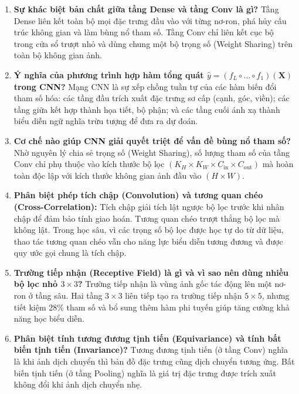 \documentclass[12pt,a4paper]{report}
\begin{document}
\begin{enumerate}[label=\textbf{\arabic*.}]
    \item \textbf{Sự khác biệt bản chất giữa tầng Dense và tầng Conv là gì?}
    Tầng Dense liên kết toàn bộ mọi đặc trưng đầu vào với từng nơ-ron, phá hủy cấu trúc không gian và làm bùng nổ tham số. Tầng Conv chỉ liên kết cục bộ trong cửa sổ trượt nhỏ và dùng chung một bộ trọng số (Weight Sharing) trên toàn bộ không gian ảnh.
    
    \item \textbf{Ý nghĩa của phương trình hợp hàm tổng quát $\hat{y} = (f_L \circ \dots \circ f_1)(\mathbf{X})$ trong CNN?}
    Mạng CNN là sự xếp chồng tuần tự của các hàm biến đổi tham số hóa: các tầng đầu trích xuất đặc trưng sơ cấp (cạnh, góc, viền); các tầng giữa kết hợp thành họa tiết, bộ phận; và các tầng cuối ánh xạ thành biểu diễn ngữ nghĩa trừu tượng để đưa ra dự đoán.
    
    \item \textbf{Cơ chế nào giúp CNN giải quyết triệt để vấn đề bùng nổ tham số?}
    Nhờ nguyên lý chia sẻ trọng số (Weight Sharing), số lượng tham số của tầng Conv chỉ phụ thuộc vào kích thước bộ lọc $(K_H \times K_W \times C_{\text{in}} \times C_{\text{out}})$ mà hoàn toàn độc lập với kích thước không gian ảnh đầu vào $(H \times W)$.
    
    \item \textbf{Phân biệt phép tích chập (Convolution) và tương quan chéo (Cross-Correlation):}
    Tích chập giải tích lật ngược bộ lọc trước khi nhân chập để đảm bảo tính giao hoán. Tương quan chéo trượt thẳng bộ lọc mà không lật. Trong học sâu, vì các trọng số bộ lọc được học tự do từ dữ liệu, thao tác tương quan chéo vẫn cho năng lực biểu diễn tương đương và được quy ước gọi chung là tích chập.
    
    \item \textbf{Trường tiếp nhận (Receptive Field) là gì và vì sao nên dùng nhiều bộ lọc nhỏ $3\times 3$?}
    Trường tiếp nhận là vùng ảnh gốc tác động lên một nơ-ron ở tầng sâu. Hai tầng $3\times 3$ liên tiếp tạo ra trường tiếp nhận $5\times 5$, nhưng tiết kiệm 28\% tham số và bổ sung thêm hàm phi tuyến giúp tăng cường khả năng học biểu diễn.
    
    \item \textbf{Phân biệt tính tương đương tịnh tiến (Equivariance) và tính bất biến tịnh tiến (Invariance)?}
    Tương đương tịnh tiến (ở tầng Conv) nghĩa là khi ảnh dịch chuyển thì bản đồ đặc trưng cũng dịch chuyển tương ứng. Bất biến tịnh tiến (ở tầng Pooling) nghĩa là giá trị đặc trưng được trích xuất không đổi khi ảnh dịch chuyển nhẹ.
    

\end{enumerate}
\end{document}
